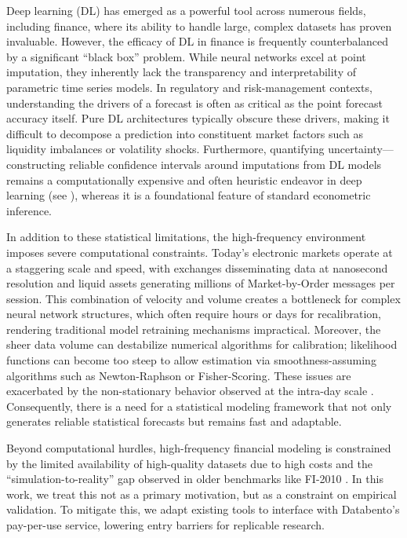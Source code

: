 \documentclass[10pt,a4paper,oneside]{article}
\begin{document}
Deep learning (DL) has emerged as a powerful tool across numerous fields, including finance, where its ability to handle large, complex datasets has proven invaluable. However, the efficacy of DL in finance is frequently counterbalanced by a significant ``black box'' problem. While neural networks excel at point imputation, they inherently lack the transparency and interpretability of parametric time series models. In regulatory and risk-management contexts, understanding the drivers of a forecast is often as critical as the point forecast accuracy itself. Pure DL architectures typically obscure these drivers, making it difficult to decompose a prediction into constituent market factors such as liquidity imbalances or volatility shocks. Furthermore, quantifying uncertainty—constructing reliable confidence intervals around imputations from DL models remains a computationally expensive and often heuristic endeavor in deep learning (see \cite{barber2023conformalpredictionexchangeability}), whereas it is a foundational feature of standard econometric inference.

In addition to these statistical limitations, the high-frequency environment imposes severe computational constraints. Today's electronic markets operate at a staggering scale and speed, with exchanges disseminating data at nanosecond resolution and liquid assets generating millions of Market-by-Order messages per session. This combination of velocity and volume creates a bottleneck for complex neural network structures, which often require hours or days for recalibration, rendering traditional model retraining mechanisms impractical. Moreover, the sheer data volume can destabilize numerical algorithms for calibration; likelihood functions can become too steep to allow estimation via smoothness-assuming algorithms such as Newton-Raphson or Fisher-Scoring. These issues are exacerbated by the non-stationary behavior observed at the intra-day scale \cite{dutta2023review, Vyetrenko2019GetRR}. Consequently, there is a need for a statistical modeling framework that not only generates reliable statistical forecasts but remains fast and adaptable.

Beyond computational hurdles, high-frequency financial modeling is constrained by the limited availability of high-quality datasets due to high costs \cite{KISSELL201447} and the ``simulation-to-reality'' gap observed in older benchmarks like FI-2010 \cite{prata2024lob}. In this work, we treat this not as a primary motivation, but as a constraint on empirical validation. To mitigate this, we adapt existing tools to interface with Databento's pay-per-use service, lowering entry barriers for replicable research.
\end{document}
